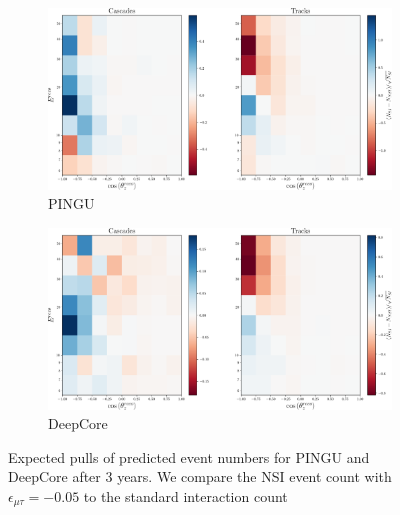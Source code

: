 \documentclass[draft=True]{revtex4-2}
\newcommand{\emt}{\ensuremath{\epsilon_{\mu\tau}}}
\begin{document}
\begin{figure}[t]
   \begin{center}
      \begin{subfigure}{0.49\textwidth}
         \includegraphics[width=1\textwidth]{figures/PINGU_event_pulls.pdf}
         \caption{PINGU}\label{fig:PINGU_event_pulls}
      \end{subfigure}
      \begin{subfigure}{0.49\textwidth}
         \includegraphics[width=1\textwidth]{figures/DC_event_pulls.pdf}
         \caption{DeepCore}\label{fig:DC_event_pulls}
      \end{subfigure}
   \end{center}
   \caption{Expected pulls of predicted event numbers for PINGU and DeepCore after 3 years. We compare the NSI event count with $\emt=-0.05$
    to the standard interaction count}\label{fig:event_pulls} 
\end{figure}
\end{document}

